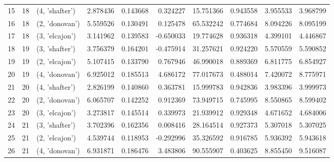 \begin{tabular}{lrlrrrrrrr}
15 &     18 &  (4, 'shafter') &  2.878436 &  0.143668 &  0.324227 &   15.751366 &  0.943558 &  3.955533 &   3.968799 \\
16 &     18 &  (2, 'donovan') &  5.559526 &  0.130491 &  0.125478 &   65.532242 &  0.774684 &  8.094226 &   8.095199 \\
17 &     18 &  (3, 'elcajon') &  3.141962 &  0.139583 & -0.650033 &   19.774628 &  0.936318 &  4.399101 &   4.446867 \\
18 &     19 &  (3, 'shafter') &  3.756379 &  0.164201 & -0.475914 &   31.257621 &  0.924220 &  5.570559 &   5.590852 \\
19 &     19 &  (2, 'elcajon') &  5.107415 &  0.133790 &  0.767946 &   46.990018 &  0.889369 &  6.811775 &   6.854927 \\
20 &     19 &  (4, 'donovan') &  6.925012 &  0.185513 &  4.686172 &   77.017673 &  0.488014 &  7.420072 &   8.775971 \\
21 &     20 &  (4, 'shafter') &  2.826199 &  0.140860 &  0.363781 &   15.999783 &  0.942836 &  3.983396 &   3.999973 \\
22 &     20 &  (2, 'donovan') &  6.065707 &  0.142252 &  0.912369 &   73.949715 &  0.745995 &  8.550865 &   8.599402 \\
23 &     20 &  (3, 'elcajon') &  3.273817 &  0.145514 &  0.339973 &   21.939912 &  0.929348 &  4.671652 &   4.684006 \\
24 &     21 &  (3, 'shafter') &  3.702396 &  0.162356 &  0.008416 &   28.164514 &  0.927373 &  5.307018 &   5.307025 \\
25 &     21 &  (2, 'elcajon') &  4.539744 &  0.118953 & -0.292996 &   35.326592 &  0.916785 &  5.936392 &   5.943618 \\
26 &     21 &  (4, 'donovan') &  6.931871 &  0.186476 &  3.483806 &   90.555907 &  0.403625 &  8.855450 &   9.516087 \\
\bottomrule
\end{tabular}
